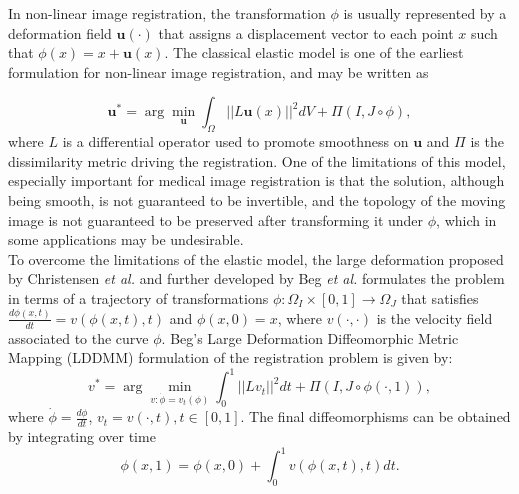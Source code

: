 In non-linear image registration, the transformation $\phi$ is usually represented by a deformation field $\mathbf{u(\cdot)}$ that assigns a displacement vector
to each point $x$ such that $\phi(x) = x + \mathbf{u}(x)$. The classical elastic model is one of the earliest formulation for non-linear image registration,
and may be written as

\begin{equation}\label{eq:elastic}
    \mathbf{u}^{*} = \arg \min_{\mathbf{u}} \int_{\Omega} ||L \mathbf{u}(x)||^{2}dV + \Pi(I, J \circ \phi),
\end{equation}
where $L$ is a differential operator used to promote smoothness on $\mathbf{u}$ and $\Pi$ is the dissimilarity metric driving the registration. One of the limitations of this model, especially important for medical image registration is that the solution, although being smooth, is not guaranteed to be invertible, and the topology of the moving image is not guaranteed to be preserved after transforming it under $\phi$, which in some applications may be undesirable.\\

To overcome the limitations of the elastic model, the large deformation proposed by  Christensen {\it et al.} \cite{Christensen2001} and further developed by Beg {\it et al.} \cite{Science2005}
formulates the problem in terms of a trajectory of transformations
\hbox{$\phi:\Omega_{I} \times [0, 1] \rightarrow \Omega_{J}$} that satisfies $\frac{d \phi(x, t)}{dt} = v(\phi(x, t), t)$ and $\phi(x, 0) = x$, where $v(\cdot, \cdot)$ is
the velocity field associated to the curve $\phi$. Beg's Large Deformation Diffeomorphic Metric Mapping (LDDMM) \cite{Science2005} formulation of the registration problem is given by:
\begin{equation}\label{eq:LDDMM}
    v^{*} = \arg \min_{v:\dot{\phi} = v_{t}(\phi)} \int_{0}^{1} ||L v_{t}||^{2} dt + \Pi(I, J \circ \phi(\cdot, 1)),
\end{equation}
where $\dot{\phi} = \frac{d\phi}{dt}$, $v_{t} = v(\cdot, t), t\in [0, 1]$. The final diffeomorphisms can be obtained by integrating over time
\begin{equation}\label{eq:velocity_integral}
    \phi(x, 1) = \phi(x, 0) + \int_{0}^{1}v(\phi(x, t), t) dt.
\end{equation}

